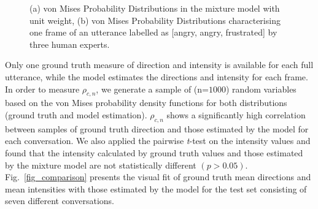\documentclass[10pt,journal,cspaper,compsoc]{IEEEtran}
\begin{document}
\begin{figure}[t!]
\begin{center}
\end{center}
		\caption{(a) von Mises Probability Distributions in the mixture model with unit weight, (b) von Mises Probability Distributions characterising one frame of an utterance labelled as [angry, angry, frustrated] by three human experts.}
		\label{fig_mixturemodelpdf}
\end{figure}

Only one ground truth measure of direction and intensity is available for each full utterance, while the model estimates the directions and intensity for each frame. In order to measure $\rho_{c,n}$, we generate a sample of (n=$1000$) random variables based on the von Mises probability density functions for both distributions (ground truth and model estimation). $\rho_{c,n}$ shows a significantly high correlation between samples of ground truth direction and those estimated by the model for each conversation. We also applied the pairwise \textit{t}-test on the intensity values and found that the intensity calculated by ground truth values and those estimated by the mixture model are not statistically different $(p>0.05)$. Fig.~\ref{fig_comparison} presents the visual fit of ground truth mean directions and mean intensities with those estimated by the model for the test set consisting of seven different conversations.
\end{document}
